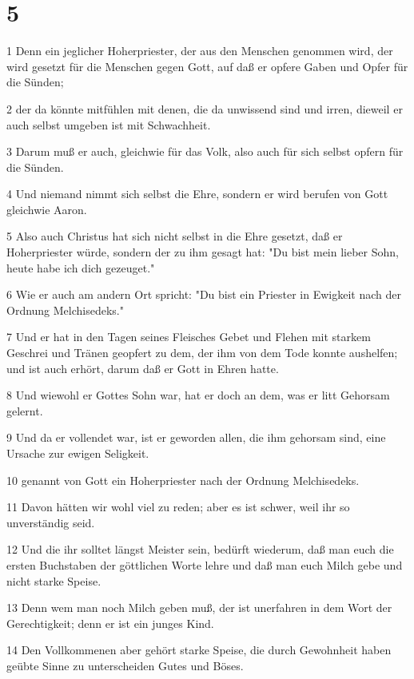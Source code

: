 \chapter{5}

\par 1 Denn ein jeglicher Hoherpriester, der aus den Menschen genommen wird, der wird gesetzt für die Menschen gegen Gott, auf daß er opfere Gaben und Opfer für die Sünden;
\par 2 der da könnte mitfühlen mit denen, die da unwissend sind und irren, dieweil er auch selbst umgeben ist mit Schwachheit.
\par 3 Darum muß er auch, gleichwie für das Volk, also auch für sich selbst opfern für die Sünden.
\par 4 Und niemand nimmt sich selbst die Ehre, sondern er wird berufen von Gott gleichwie Aaron.
\par 5 Also auch Christus hat sich nicht selbst in die Ehre gesetzt, daß er Hoherpriester würde, sondern der zu ihm gesagt hat: "Du bist mein lieber Sohn, heute habe ich dich gezeuget."
\par 6 Wie er auch am andern Ort spricht: "Du bist ein Priester in Ewigkeit nach der Ordnung Melchisedeks."
\par 7 Und er hat in den Tagen seines Fleisches Gebet und Flehen mit starkem Geschrei und Tränen geopfert zu dem, der ihm von dem Tode konnte aushelfen; und ist auch erhört, darum daß er Gott in Ehren hatte.
\par 8 Und wiewohl er Gottes Sohn war, hat er doch an dem, was er litt Gehorsam gelernt.
\par 9 Und da er vollendet war, ist er geworden allen, die ihm gehorsam sind, eine Ursache zur ewigen Seligkeit.
\par 10 genannt von Gott ein Hoherpriester nach der Ordnung Melchisedeks.
\par 11 Davon hätten wir wohl viel zu reden; aber es ist schwer, weil ihr so unverständig seid.
\par 12 Und die ihr solltet längst Meister sein, bedürft wiederum, daß man euch die ersten Buchstaben der göttlichen Worte lehre und daß man euch Milch gebe und nicht starke Speise.
\par 13 Denn wem man noch Milch geben muß, der ist unerfahren in dem Wort der Gerechtigkeit; denn er ist ein junges Kind.
\par 14 Den Vollkommenen aber gehört starke Speise, die durch Gewohnheit haben geübte Sinne zu unterscheiden Gutes und Böses.

